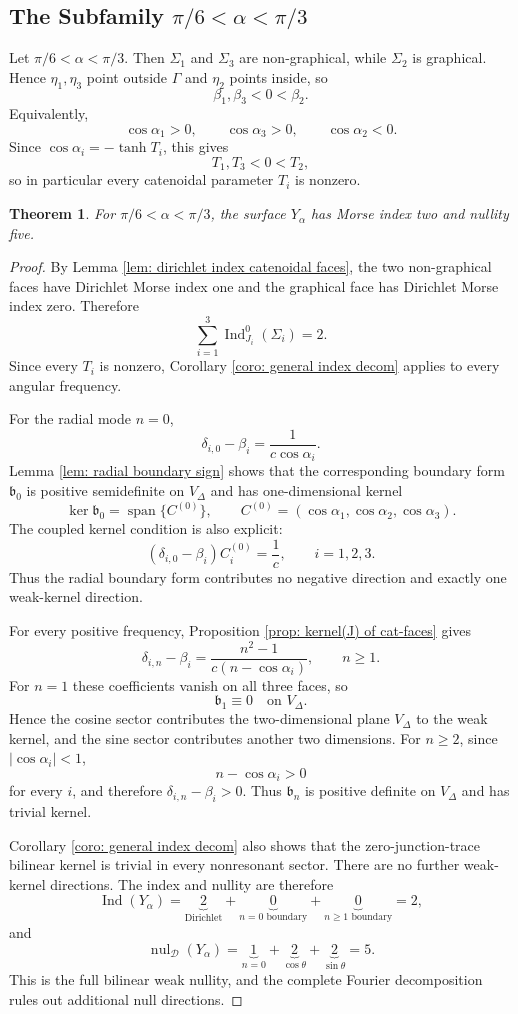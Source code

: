 \documentclass[11pt,twoside]{amsart}
\newtheorem{thm}{Theorem}[section]
\numberwithin{equation}{section}
\begin{document}
\subsection{The Subfamily \texorpdfstring{$\pi/6<\alpha<\pi/3$}{pi/6 < alpha < pi/3}}
Let $\pi/6<\alpha<\pi/3$. Then $\Sigma_1$ and $\Sigma_3$ are non-graphical, while $\Sigma_2$ is graphical. Hence $\eta_1,\eta_3$ point outside $\Gamma$ and $\eta_2$ points inside, so
\[
\beta_1,\beta_3<0<\beta_2.
\]
Equivalently,
\[
\cos\alpha_1>0,\qquad \cos\alpha_3>0,\qquad \cos\alpha_2<0.
\]
Since $\cos\alpha_i=-\tanh T_i$, this gives
\[
T_1,T_3<0<T_2,
\]
so in particular every catenoidal parameter $T_i$ is nonzero.

\begin{thm}
For $\pi/6<\alpha<\pi/3$, the surface $Y_\alpha$ has Morse index two and nullity five.
\end{thm}
\begin{proof}
By Lemma \ref{lem: dirichlet index catenoidal faces}, the two non-graphical faces have Dirichlet Morse index one and the graphical face has Dirichlet Morse index zero. Therefore
\[
\sum_{i=1}^3\operatorname{Ind}_{J_i}^0(\Sigma_i)=2.
\]
Since every $T_i$ is nonzero, Corollary \ref{coro: general index decom} applies to every angular frequency.

For the radial mode $n=0$,
\[
\delta_{i,0}-\beta_i=\frac{1}{c\cos\alpha_i}.
\]
Lemma \ref{lem: radial boundary sign} shows that the corresponding boundary form $\mathfrak b_0$ is positive semidefinite on $V_\Delta$ and has one-dimensional kernel
\[
\ker\mathfrak b_0
=\operatorname{span}\{C^{(0)}\},
\qquad
C^{(0)}=(\cos\alpha_1,\cos\alpha_2,\cos\alpha_3).
\]
The coupled kernel condition is also explicit:
\[
(\delta_{i,0}-\beta_i)C_i^{(0)}=\frac1c,
\qquad i=1,2,3.
\]
Thus the radial boundary form contributes no negative direction and exactly one weak-kernel direction.

For every positive frequency, Proposition \ref{prop: kernel(J) of cat-faces} gives
\[
\delta_{i,n}-\beta_i
=\frac{n^2-1}{c(n-\cos\alpha_i)},
\qquad n\ge1.
\]
For $n=1$ these coefficients vanish on all three faces, so
\[
\mathfrak b_1\equiv0\quad\text{on }V_\Delta.
\]
Hence the cosine sector contributes the two-dimensional plane $V_\Delta$ to the weak kernel, and the sine sector contributes another two dimensions. For $n\ge2$, since $|\cos\alpha_i|<1$,
\[
n-\cos\alpha_i>0
\]
for every $i$, and therefore $\delta_{i,n}-\beta_i>0$. Thus $\mathfrak b_n$ is positive definite on $V_\Delta$ and has trivial kernel.

Corollary \ref{coro: general index decom} also shows that the zero-junction-trace bilinear kernel is trivial in every nonresonant sector. There are no further weak-kernel directions. The index and nullity are therefore
\[
\operatorname{Ind}(Y_\alpha)
=\underbrace{2}_{\text{Dirichlet}}+
\underbrace{0}_{n=0\text{ boundary}}+
\underbrace{0}_{n\ge1\text{ boundary}}
=2,
\]
and
\[
\operatorname{nul}_{\mathcal D}(Y_\alpha)
=\underbrace{1}_{n=0}+
\underbrace{2}_{\cos\theta}+
\underbrace{2}_{\sin\theta}
=5.
\]
This is the full bilinear weak nullity, and the complete Fourier decomposition rules out additional null directions.
\end{proof}
\end{document}
